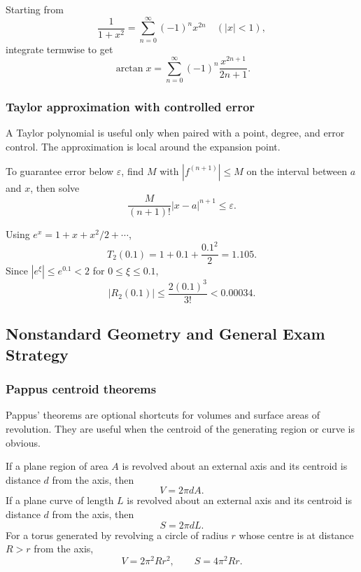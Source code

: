 \begin{examplebox}[title={Series by Integration}]
Starting from
\[
\frac1{1+x^2}=\sum_{n=0}^\infty(-1)^n x^{2n}\quad(|x|<1),
\]
integrate termwise to get
\[
\arctan x=\sum_{n=0}^\infty(-1)^n\frac{x^{2n+1}}{2n+1}.
\]
\end{examplebox}

\newpage
\subsubsection{Taylor approximation with controlled error}
\begin{extension}
A Taylor polynomial is useful only when paired with a point, degree, and error
control.  The approximation is local around the expansion point.
\end{extension}

\begin{examtip}
To guarantee error below \(\varepsilon\), find \(M\) with
\(|f^{(n+1)}|\le M\) on the interval between \(a\) and \(x\), then solve
\[
\frac{M}{(n+1)!}|x-a|^{n+1}\le\varepsilon.
\]
\end{examtip}

\begin{examplebox}[title={Small Exponential Approximation}]
Using \(e^x=1+x+x^2/2+\cdots\),
\[
T_2(0.1)=1+0.1+\frac{0.1^2}{2}=1.105.
\]
Since \(|e^\xi|\le e^{0.1}<2\) for \(0\le\xi\le0.1\),
\[
|R_2(0.1)|\le\frac{2(0.1)^3}{3!}<0.00034.
\]
\end{examplebox}

\newpage
\subsection{Nonstandard Geometry and General Exam Strategy}

\subsubsection{Pappus centroid theorems}
\begin{extension}
Pappus' theorems are optional shortcuts for volumes and surface areas of
revolution.  They are useful when the centroid of the generating region or
curve is obvious.
\end{extension}

\begin{keyformula}[title={Pappus Theorems}]
If a plane region of area \(A\) is revolved about an external axis and its
centroid is distance \(d\) from the axis, then
\[
V=2\pi dA.
\]
If a plane curve of length \(L\) is revolved about an external axis and its
centroid is distance \(d\) from the axis, then
\[
S=2\pi dL.
\]
For a torus generated by revolving a circle of radius \(r\) whose centre is
at distance \(R>r\) from the axis,
\[
V=2\pi^2Rr^2,
\qquad
S=4\pi^2Rr.
\]
\end{keyformula}

